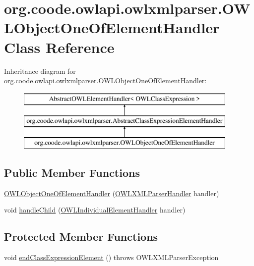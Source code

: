 \hypertarget{classorg_1_1coode_1_1owlapi_1_1owlxmlparser_1_1_o_w_l_object_one_of_element_handler}{\section{org.\-coode.\-owlapi.\-owlxmlparser.\-O\-W\-L\-Object\-One\-Of\-Element\-Handler Class Reference}
\label{classorg_1_1coode_1_1owlapi_1_1owlxmlparser_1_1_o_w_l_object_one_of_element_handler}
}
Inheritance diagram for org.\-coode.\-owlapi.\-owlxmlparser.\-O\-W\-L\-Object\-One\-Of\-Element\-Handler\-:\begin{figure}[H]
\begin{center}
\leavevmode
\includegraphics[height=3.000000cm]{classorg_1_1coode_1_1owlapi_1_1owlxmlparser_1_1_o_w_l_object_one_of_element_handler}
\end{center}
\end{figure}
\subsection*{Public Member Functions}
\begin{DoxyCompactItemize}
\item 
\hyperlink{classorg_1_1coode_1_1owlapi_1_1owlxmlparser_1_1_o_w_l_object_one_of_element_handler_aefe560b2585c8e953624b1c3d0e27da4}{O\-W\-L\-Object\-One\-Of\-Element\-Handler} (\hyperlink{classorg_1_1coode_1_1owlapi_1_1owlxmlparser_1_1_o_w_l_x_m_l_parser_handler}{O\-W\-L\-X\-M\-L\-Parser\-Handler} handler)
\item 
void \hyperlink{classorg_1_1coode_1_1owlapi_1_1owlxmlparser_1_1_o_w_l_object_one_of_element_handler_a4800bb86f71c184ab643070e62167d3e}{handle\-Child} (\hyperlink{classorg_1_1coode_1_1owlapi_1_1owlxmlparser_1_1_o_w_l_individual_element_handler}{O\-W\-L\-Individual\-Element\-Handler} handler)
\end{DoxyCompactItemize}
\subsection*{Protected Member Functions}
\begin{DoxyCompactItemize}
\item 
void \hyperlink{classorg_1_1coode_1_1owlapi_1_1owlxmlparser_1_1_o_w_l_object_one_of_element_handler_a527501bbe75bc48f2ffb5d1b477296cc}{end\-Class\-Expression\-Element} ()  throws O\-W\-L\-X\-M\-L\-Parser\-Exception 
\end{DoxyCompactItemize}
